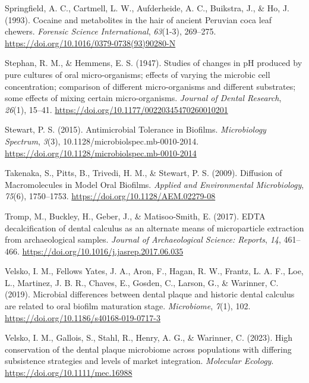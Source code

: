 \documentclass[
  b5paper,
]{book}
\newlength{\cslhangindent}
\newenvironment{CSLReferences}[2] %
 {\begin{list}{}{%
  \setlength{\itemindent}{0pt}
  \setlength{\leftmargin}{0pt}
  \setlength{\parsep}{0pt}
  \ifodd #1
   \setlength{\leftmargin}{\cslhangindent}
   \setlength{\itemindent}{-1\cslhangindent}
  \fi
  \setlength{\itemsep}{#2\baselineskip}}}
 {\end{list}}
\begin{document}
\begin{CSLReferences}{1}{0}
Springfield, A. C., Cartmell, L. W., Aufderheide, A. C., Buikstra, J.,
\& Ho, J. (1993). Cocaine and metabolites in the hair of ancient
{Peruvian} coca leaf chewers. \emph{Forensic Science International},
\emph{63}(1-3), 269--275.
\url{https://doi.org/10.1016/0379-0738(93)90280-N}

Stephan, R. M., \& Hemmens, E. S. (1947). Studies of changes in {pH}
produced by pure cultures of oral micro-organisms; effects of varying
the microbic cell concentration; comparison of different micro-organisms
and different substrates; some effects of mixing certain
micro-organisms. \emph{Journal of Dental Research}, \emph{26}(1),
15--41. \url{https://doi.org/10.1177/00220345470260010201}

Stewart, P. S. (2015). Antimicrobial {Tolerance} in {Biofilms}.
\emph{Microbiology Spectrum}, \emph{3}(3),
10.1128/microbiolspec.mb-0010-2014.
\url{https://doi.org/10.1128/microbiolspec.mb-0010-2014}

Takenaka, S., Pitts, B., Trivedi, H. M., \& Stewart, P. S. (2009).
Diffusion of {Macromolecules} in {Model Oral Biofilms}. \emph{Applied
and Environmental Microbiology}, \emph{75}(6), 1750--1753.
\url{https://doi.org/10.1128/AEM.02279-08}

Tromp, M., Buckley, H., Geber, J., \& Matisoo-Smith, E. (2017). {EDTA}
decalcification of dental calculus as an alternate means of
microparticle extraction from archaeological samples. \emph{Journal of
Archaeological Science: Reports}, \emph{14}, 461--466.
\url{https://doi.org/10.1016/j.jasrep.2017.06.035}

Velsko, I. M., Fellows Yates, J. A., Aron, F., Hagan, R. W., Frantz, L.
A. F., Loe, L., Martinez, J. B. R., Chaves, E., Gosden, C., Larson, G.,
\& Warinner, C. (2019). Microbial differences between dental plaque and
historic dental calculus are related to oral biofilm maturation stage.
\emph{Microbiome}, \emph{7}(1), 102.
\url{https://doi.org/10.1186/s40168-019-0717-3}

Velsko, I. M., Gallois, S., Stahl, R., Henry, A. G., \& Warinner, C.
(2023). High conservation of the dental plaque microbiome across
populations with differing subsistence strategies and levels of market
integration. \emph{Molecular Ecology}.
\url{https://doi.org/10.1111/mec.16988}


\end{CSLReferences}
\end{document}
